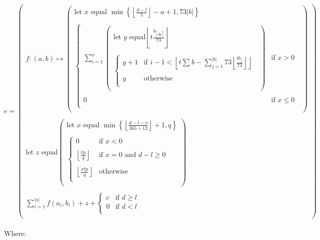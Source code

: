 \documentclass{article}
\begin{document}
\begin{sloppypar}
\[e = \begin{pmatrix}
  f:\left( a,b \right) \mapsto \begin{pmatrix}
  \text{let\ }x\text{\ equal\ }\min\left\{ \left\lfloor \frac{d - l}{5} \right\rfloor - a + 1,73\left| b \right| \right\} \\
  \\
  \left\{ \begin{matrix}
  \sum_{i = 1}^{x}\begin{pmatrix}
  \text{let\ }y\text{\ equal}\left\lfloor t\frac{b_{\left\lceil \frac{i}{73} \right\rceil}}{73} \right\rfloor \\
  \\
  \left\{ \begin{matrix}
  y + 1 & \text{if\ }i - 1 < \left\lfloor t\sum_{}^{}b - \sum_{j = 1}^{\left| b \right|}{73\left\lfloor \frac{tb_{j}}{73} \right\rfloor} \right\rfloor \\
  & \\
  y & \text{otherwise} \\
  \end{matrix} \right.\  \\
  \end{pmatrix} & \text{if\ }x > 0 \\
  & \\
  0 & \text{if\ }x \leq 0 \\
  \end{matrix} \right.\  \\
  \end{pmatrix} \\
  \\
  \text{let\ }z\text{\ equal}\begin{pmatrix}
  \text{let\ }x\text{\ equal\ }\min\left\{ \left\lfloor \frac{d - l - o}{365 \div 12} \right\rfloor + 1,q \right\} \\
  \\
  \left\{ \begin{matrix}
  0 & \text{if\ }x < 0 \\
  & \\
  \left\lfloor \frac{tp}{q} \right\rfloor & \text{if\ }x = 0\text{\ and\ }d - l \geq 0 \\
  & \\
  \left\lfloor \frac{xtp}{q} \right\rfloor & \text{otherwise} \\
  \end{matrix} \right.\  \\
  \end{pmatrix} \\
  \\
  \sum_{i = 1}^{\left| a \right|}{f\left( a_{i},b_{i} \right)} + z + \left\{ \begin{matrix}
  c & \text{if\ }d \geq l \\
  0 & \text{if\ }d < l \\
  \end{matrix} \right.\  \\
  \end{pmatrix}\]\\
Where:


\end{sloppypar}
\end{document}
